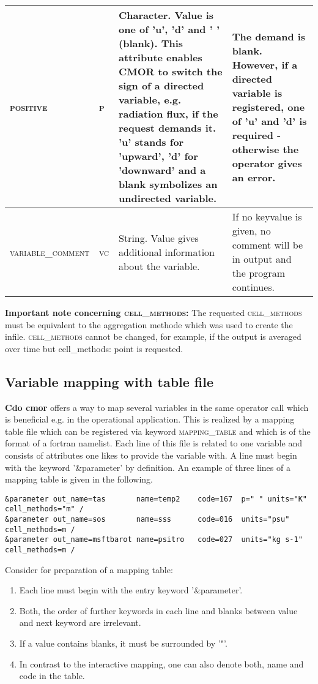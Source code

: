 \begin{table}[H]
\begin{tabular}[H]{|l|p{1cm}|p{6cm} | p{5cm} | }
\hline
\textsc{positive} & \textsc{p} & Character. Value is one of 'u', 'd' and ' ' (blank). This attribute enables CMOR to switch the sign of a directed variable, e.g. radiation flux, if the request demands it. 'u' stands for 'upward', 'd' for 'downward' and a blank symbolizes an undirected variable. & The demand is blank. However, if a directed variable is registered, one of 'u' and 'd' is required - otherwise the operator gives an error.\\
\hline
\textsc{variable\_comment} & \textsc{vc} & String. Value gives additional information about the variable. & If no keyvalue is given, no comment will be in output and the program continues.\\ 
\hline
\end{tabular} 
\end{table}

\textbf{Important note concerning \textsc{cell\_methods}:} The requested \textsc{cell\_methods} must be equivalent to the aggregation methode which was used to create the infile. \textsc{cell\_methods} cannot be changed, for example, if the output is averaged over time but cell\_methods: point is requested.

\subsection{Variable mapping with table file}

\textbf{Cdo cmor} offers a way to map several variables in the same operator call which is beneficial e.g. in the operational application. This is realized by a mapping table file which can be registered via keyword \textsc{mapping\_table} and which is of the format of a fortran namelist. Each line of this file is related to one variable and consists of attributes one likes to provide the variable with. A line must begin with the keyword '\&parameter' by definition. An example of three lines of a mapping table is given in the following.

\begin{verbatim}
&parameter out_name=tas       name=temp2    code=167  p=" " units="K" cell_methods="m" /
&parameter out_name=sos       name=sss      code=016  units="psu"     cell_methods=m /
&parameter out_name=msftbarot name=psitro   code=027  units="kg s-1"  cell_methods=m /
\end{verbatim}

Consider for preparation of a mapping table:

\begin{enumerate}
\item Each line must begin with the entry keyword '\&parameter'.
\item Both, the order of further keywords in each line and blanks between value and next keyword are irrelevant.
\item If a value contains blanks, it must be surrounded by '"'.
\item In contrast to the interactive mapping, one can also denote both, name and code in the table.
\end{enumerate}

